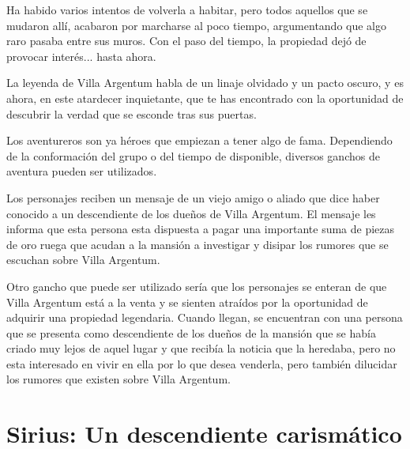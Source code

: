 \documentclass[10pt,twoside,twocolumn,openany]{dndbook}
\begin{document}
Ha habido varios intentos de volverla a habitar, pero todos aquellos que se mudaron allí, acabaron
por marcharse al poco tiempo, argumentando que algo raro pasaba entre sus muros. Con el paso del 
tiempo, la propiedad dejó de provocar interés... hasta ahora.

La leyenda de Villa Argentum habla de un linaje olvidado y un pacto oscuro, y es ahora, en este
atardecer inquietante, que te has encontrado con la oportunidad de descubrir la verdad que se 
esconde tras sus puertas.

Los aventureros son ya héroes que empiezan a tener algo de fama. Dependiendo de la conformación 
del grupo o del tiempo de disponible, diversos ganchos de aventura pueden ser utilizados.

Los personajes reciben un mensaje de un viejo amigo o aliado que dice haber conocido a un 
descendiente de los dueños de Villa Argentum. El mensaje les informa que esta persona esta 
dispuesta a pagar una importante suma de piezas de oro ruega que acudan a la mansión a investigar
y disipar los rumores que se escuchan sobre Villa Argentum.

Otro gancho que puede ser utilizado sería que los personajes se enteran de que Villa Argentum está 
a la venta y se sienten atraídos por la oportunidad de adquirir una propiedad legendaria. Cuando 
llegan, se encuentran con una persona que se presenta como descendiente de los dueños de la 
mansión que se había criado muy lejos de aquel lugar y que recibía la noticia que la heredaba,
pero no esta interesado en vivir en ella por lo que desea venderla, pero también dilucidar los
rumores que existen sobre Villa Argentum.


\section{Sirius: Un descendiente carismático}
\end{document}
